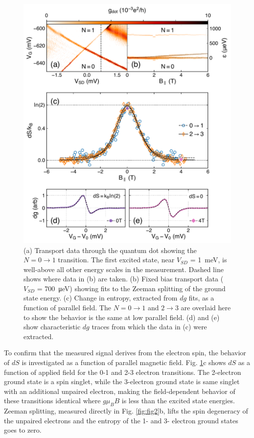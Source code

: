 \documentclass[twocolumn,showpacs,preprintnumbers,amsmath,amssymb,pra,aps,superscriptaddress]{revtex4-1}
\begin{document}
\begin{figure}
        \includegraphics[width=1.0\columnwidth]{../figures/figure_3.pdf}
        \caption{\label{fig:fig3}(a) Transport data through the quantum dot showing the $N=0 \rightarrow 1$ transition. The first excited state, near $V_{SD}$ = \SI{1}{\milli\electronvolt}, is well-above all other energy scales in the measurement. Dashed line shows where data in (b) are taken. (b) Fixed bias transport data ($V_{SD}$ = \SI{700}{\micro\electronvolt}) showing fits to the Zeeman splitting of the ground state energy. (c) Change in entropy, extracted from $dg$ fits, as a function of parallel field. The $N=0 \rightarrow 1$ and $2 \rightarrow 3$ are overlaid here to show the behavior is the same at low parallel field. (d) and (e) show characteristic $dg$ traces from which the data in (c) were extracted.}
\end{figure}

To confirm that the measured signal derives from the electron spin, the behavior of $dS$ is investigated as a function of parallel magnetic field. Fig. \ref{fig:fig3}c shows $dS$ as a function of applied field for the 0-1 and 2-3 electron transitions. The 2-electron ground state is a spin singlet, while the 3-electron ground state is same singlet with an additional unpaired electron, making the field-dependent behavior of these transitions identical where $g \mu_{B} B$ is less than the excited state energies. Zeeman splitting, measured directly in Fig. \ref{fig:fig2}b, lifts the spin degeneracy of the unpaired electrons and the entropy of the 1- and 3- electron ground states goes to zero.
\end{document}
